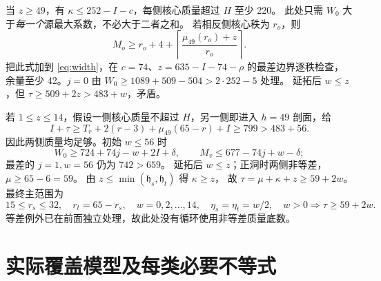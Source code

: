 \documentclass[11pt,a4paper]{article}
\begin{document}
当 $z\ge49$，有 $\kappa\le252-I-c$，每侧核心质量超过 $H$ 至少 220。
此处只需 $W_0$ 大于\emph{每一个}源最大系数，不必大于二者之和。
若相反侧核心秩为 $r_o$，则
\[
 M_o\ge r_o+4+\left\lceil\frac{\mu_{49}(r_o)+z}{r_o}\right\rceil.
\]
把此式加到 \eqref{eq:width}，在 $c=74$、$z=635-I-74-\rho$ 的最差边界逐秩检查，
余量至少 42。$j=0$ 由 $W_0\ge1089+509-504>2\cdot252-5$ 处理。
延拓后 $w\le z$，但 $\tau\ge509+2z>483+w$，矛盾。

若 $1\le z\le14$，假设一侧核心质量不超过 $H$，另一侧即进入 $h=49$ 剖面，给
\[
 I+\tau\ge T_r+2(r-3)+\mu_{49}(65-r)+I\ge799>483+56.
\]
因此两侧质量均足够。初始 $w\le56$ 时
\[
 W_0\ge724+74j-w+2I+\delta,
 \qquad M_v\le677-74j+w-\delta;
\]
最差的 $j=1,w=56$ 仍为 $742>659$。
延拓后 $w\le z$；正洞时两侧非等差，$\mu\ge65-6=59$。
由 $z\le\min(\mathfrak h_s,\mathfrak h_t)$ 得 $\kappa\ge z$，
故 $\tau=\mu+\kappa+z\ge59+2w$。最终主范围为
\begin{equation}
 15\le r_s\le32,\quad r_t=65-r_s,\quad
 w=0,2,\ldots,14,\quad \eta_s=\eta_t=w/2,
 \quad w>0\Longrightarrow\tau\ge59+2w.\label{eq:mainrange}
\end{equation}
等差例外已在前面独立处理，故此处没有循环使用非等差质量底数。

\section{实际覆盖模型及每类必要不等式}
\end{document}
